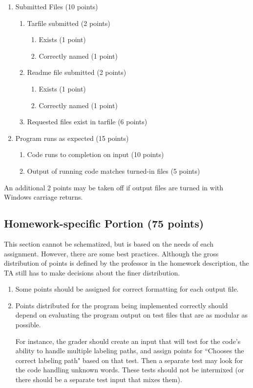 \documentclass[12pt]{article}
\begin{document}
\begin{enumerate}
\item Submitted Files (10 points)
  \begin{enumerate}
    \item Tarfile submitted (2 points)
    \begin{enumerate}
      \item Exists (1 point)
      \item Correctly named (1 point)
    \end{enumerate}
    \item Readme file submitted (2 points)
    \begin{enumerate}
      \item Exists (1 point)
      \item Correctly named (1 point)
    \end{enumerate}
    \item Requested files exist in tarfile (6 points)
  \end{enumerate}
  \item Program runs as expected (15 points)
  \begin{enumerate}
    \item Code runs to completion on input (10 points)
    \item Output of running code matches turned-in files (5 points)
  \end{enumerate}
\end{enumerate}

An additional 2 points may be taken off if output files are turned in with Windows carriage returns.

\subsection{Homework-specific Portion (75 points)} \label{sec:specificrubric}

This section cannot be schematized, but is based on the needs of each assignment. However, there are some best practices. Although the gross distribution of points is defined by the professor in the homework description, the TA still has to make decisions about the finer distribution.

\begin{enumerate}
\item {Some points should be assigned for correct formatting for each output file.}
 
\item {Points distributed for the program being implemented correctly should depend on evaluating the program output on test files that are as modular as possible.

For instance, the grader should create an input that will test for the code's ability to handle multiple labeling paths, and assign points for ``Chooses the correct labeling path" based on that test. Then a separate test may look for the code handling unknown words. These tests should not be intermixed (or there should be a separate test input that mixes them). }
 
\end{enumerate}
\end{document}
